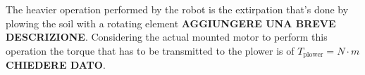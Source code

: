 	The heavier operation performed by the robot is the extirpation that's done by plowing the soil with a rotating element \textbf{AGGIUNGERE UNA BREVE DESCRIZIONE}. Considering the actual mounted motor to perform this operation the torque that has to be transmitted to the plower is of $T_\textrm{plower} = N\cdot m$ \textbf{CHIEDERE DATO}.

	
	
	
	
	
	
	
	
	
	
	
	
	
	
	
	
	
	
	
	
	
	
	
	
	